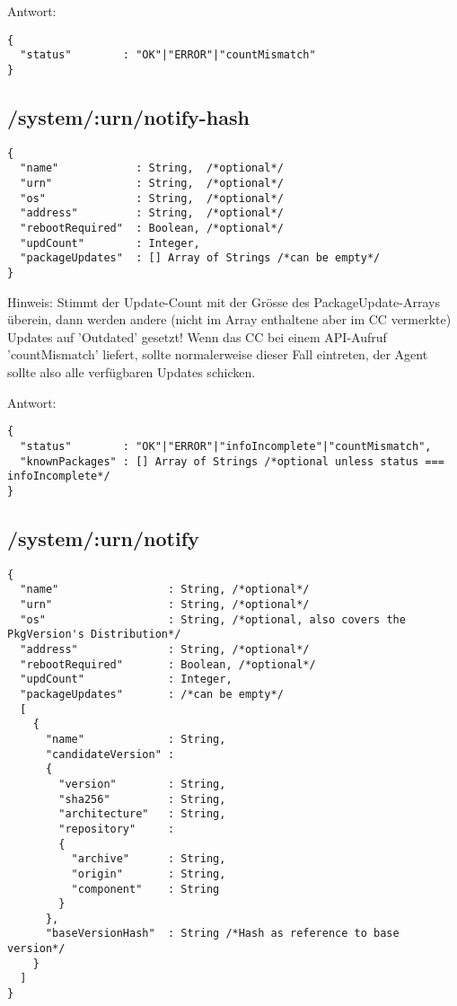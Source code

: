 Antwort:

\begin{verbatim}
{
  "status"        : "OK"|"ERROR"|"countMismatch" 
}
\end{verbatim}

\subsection*{/system/:urn/notify-hash}

\begin{verbatim}
{
  "name"            : String,  /*optional*/
  "urn"             : String,  /*optional*/
  "os"              : String,  /*optional*/
  "address"         : String,  /*optional*/
  "rebootRequired"  : Boolean, /*optional*/
  "updCount"        : Integer,
  "packageUpdates"  : [] Array of Strings /*can be empty*/
}
\end{verbatim}

Hinweis: Stimmt der Update-Count mit der Grösse des PackageUpdate-Arrays überein, dann werden andere (nicht im Array enthaltene aber im CC vermerkte) Updates auf 'Outdated' gesetzt! Wenn das CC bei einem API-Aufruf 'countMismatch' liefert, sollte normalerweise dieser Fall eintreten, der Agent sollte also alle verfügbaren Updates schicken.


Antwort:

\begin{verbatim}
{
  "status"        : "OK"|"ERROR"|"infoIncomplete"|"countMismatch",
  "knownPackages" : [] Array of Strings /*optional unless status === infoIncomplete*/
}
\end{verbatim}

\subsection*{/system/:urn/notify}

\begin{verbatim}
{
  "name"                 : String, /*optional*/
  "urn"                  : String, /*optional*/
  "os"                   : String, /*optional, also covers the PkgVersion's Distribution*/
  "address"              : String, /*optional*/
  "rebootRequired"       : Boolean, /*optional*/
  "updCount"             : Integer,
  "packageUpdates"       : /*can be empty*/
  [
    {
      "name"             : String,
      "candidateVersion" :
      {
        "version"        : String,
        "sha256"         : String,
        "architecture"   : String,
        "repository"     :
        {
          "archive"      : String,
          "origin"       : String,
          "component"    : String
        }
      },
      "baseVersionHash"  : String /*Hash as reference to base version*/
    }
  ]
}
\end{verbatim}


